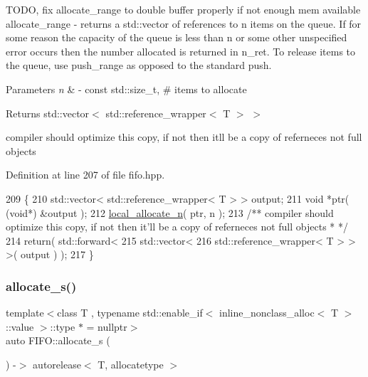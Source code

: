 T\+O\+DO, fix allocate\+\_\+range to double buffer properly if not enough mem available allocate\+\_\+range -\/ returns a std\+::vector of references to n items on the queue. If for some reason the capacity of the queue is less than n or some other unspecified error occurs then the number allocated is returned in n\+\_\+ret. To release items to the queue, use push\+\_\+range as opposed to the standard push. 
\begin{DoxyParams}{Parameters}
{\em n} & -\/ const std\+::size\+\_\+t, \# items to allocate \\
\hline
\end{DoxyParams}
\begin{DoxyReturn}{Returns}
std\+::vector$<$ std\+::reference\+\_\+wrapper$<$ T $>$ $>$ 
\end{DoxyReturn}
compiler should optimize this copy, if not then it\textquotesingle{}ll be a copy of referneces not full objects 

Definition at line 207 of file fifo.\+hpp.


\begin{DoxyCode}
209    \{
210       std::vector< std::reference\_wrapper< T > > output;
211       \textcolor{keywordtype}{void} *ptr( (\textcolor{keywordtype}{void}*) &output );
212       \hyperlink{class_f_i_f_o_a4acc34ebbad9df32f54ae8c618ffa0c0}{local\_allocate\_n}( ptr, n );\textcolor{comment}{}
213 \textcolor{comment}{      /** compiler should optimize this copy, if not then it'll be a copy of referneces not full objects *
      */}
214       \textcolor{keywordflow}{return}( std::forward<
215          std::vector< 
216             std::reference\_wrapper< T > > >( output ) );
217    \}
\end{DoxyCode}
\hypertarget{class_f_i_f_o_a9033768546db45b5f06103d32fec4b65}{}\label{class_f_i_f_o_a9033768546db45b5f06103d32fec4b65} 
\subsubsection{\texorpdfstring{allocate\+\_\+s()}{allocate\_s()}\hspace{0.1cm}{\footnotesize\ttfamily [1/2]}}
{\footnotesize\ttfamily template$<$class T , typename std\+::enable\+\_\+if$<$ inline\+\_\+nonclass\+\_\+alloc$<$ T $>$\+::value $>$\+::type $\ast$  = nullptr$>$ \\
auto F\+I\+F\+O\+::allocate\+\_\+s (\begin{DoxyParamCaption}{ }\end{DoxyParamCaption}) -\/$>$ autorelease$<$ T, allocatetype $>$
   \hspace{0.3cm}{\ttfamily [inline]}}

